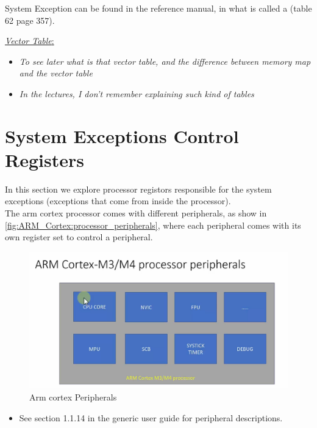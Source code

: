System Exception can be found in the reference manual, in what is called a  (table 62 page 357).

 \underline{\textit{Vector Table}:}

\begin{itemize}

\item \textit{To see later what is that vector table, and the difference between memory map and the vector table}

\item \textit{In the lectures, I don't remember explaining such kind of tables}

\end{itemize} 

\newpage
\section{System Exceptions Control Registers}

In this section we explore processor registors responsible for the system exceptions (exceptions that come from inside the processor).\\

The arm cortex processor comes with different peripherals, as show in \autoref{fig:ARM_Cortex:processor_peripherals}, where each peripheral comes with its own register set to control a peripheral.

\begin{figure}[h]
\centering
\includegraphics[scale=0.4]{Figures/ARM_Cortex/processor_peripherals}
\caption{Arm cortex Peripherals}
\label{fig:ARM_Cortex:processor_peripherals}
\end{figure}

\begin{itemize}

\item See section 1.1.14 in the generic user guide for peripheral descriptions.

\end{itemize}

